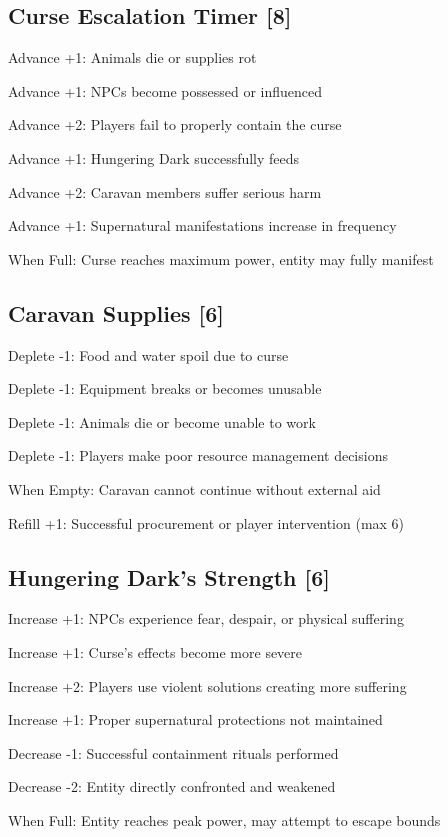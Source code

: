 \documentclass[11pt]{article}
\newenvironment{mechanics}{\begin{description}[leftmargin=*,style=standard]}{\end{description}}
\begin{document}
\subsection{Curse Escalation Timer [8]}
\begin{mechanics}
\item[Advance +1:] Animals die or supplies rot
\item[Advance +1:] NPCs become possessed or influenced
\item[Advance +2:] Players fail to properly contain the curse
\item[Advance +1:] Hungering Dark successfully feeds
\item[Advance +2:] Caravan members suffer serious harm
\item[Advance +1:] Supernatural manifestations increase in frequency
\item[When Full:] Curse reaches maximum power, entity may fully manifest
\end{mechanics}

\subsection{Caravan Supplies [6]}
\begin{mechanics}
\item[Deplete -1:] Food and water spoil due to curse
\item[Deplete -1:] Equipment breaks or becomes unusable
\item[Deplete -1:] Animals die or become unable to work
\item[Deplete -1:] Players make poor resource management decisions
\item[When Empty:] Caravan cannot continue without external aid
\item[Refill +1:] Successful procurement or player intervention (max 6)
\end{mechanics}

\subsection{Hungering Dark's Strength [6]}
\begin{mechanics}
\item[Increase +1:] NPCs experience fear, despair, or physical suffering
\item[Increase +1:] Curse's effects become more severe
\item[Increase +2:] Players use violent solutions creating more suffering
\item[Increase +1:] Proper supernatural protections not maintained
\item[Decrease -1:] Successful containment rituals performed
\item[Decrease -2:] Entity directly confronted and weakened
\item[When Full:] Entity reaches peak power, may attempt to escape bounds
\end{mechanics}
\end{document}
